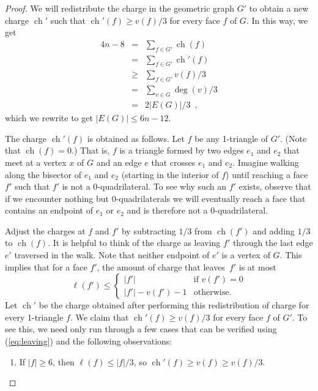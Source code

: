 \documentclass{patmorin}
\DeclareMathOperator{\ch}{ch}
\newcommand{\eqlabel}[1]{\label{eq:#1}}
\newcommand{\eqref}[1]{(\ref{eq:#1})}
\begin{document}
\begin{proof}
We will redistribute the charge in the geometric graph $G'$ to obtain a new charge $\ch'$
such that $\ch'(f) \ge v(f)/3$ for every face $f$ of $G$.  In this way, we
get
\begin{eqnarray*}
4n-8    & =  &  \sum_{f\in G'} \ch(f)\\
        & =  &  \sum_{f\in G'} \ch'(f)\\
        & \ge & \sum_{f\in G'} v(f)/3\\
        & = &   \sum_{v\in G} \deg(v)/3\\
        & = & 2|E(G)|/3 \enspace ,
\end{eqnarray*}
which we rewrite to get $|E(G)| \le 6n-12$.

The charge $\ch'(f)$ is obtained as follows.  Let $f$ be any 1-triangle of
$G'$.  (Note that $\ch(f) = 0$.)   That is, $f$ is a triangle formed by two
edges $e_1$ and $e_2$ that meet at a vertex $x$ of $G$ and an edge $e$ that
crosses $e_1$ and $e_2$.
Imagine walking along the bisector of $e_1$ and $e_2$ (starting in the
interior of $f$) until reaching a face $f'$ such that $f'$ is not a
0-quadrilateral.  To see why such an $f'$ exists, observe that if we
encounter nothing but 0-quadrilaterals we will eventually reach a face that
contains an endpoint of $e_1$ or $e_2$ and is therefore not a
0-quadrilateral.

Adjust the charges at $f$ and $f'$ by subtracting $1/3$ from $\ch(f')$ and
adding $1/3$ to $\ch(f)$.  It is helpful to think of the charge as leaving
$f'$ through the last edge $e'$ traversed in the walk.  Note that neither
endpoint of $e'$ is a vertex of $G$.  This implies that for a face $f'$,
the amount of charge that leaves~$f'$ is at most
\begin{equation}
   \ell(f') \le \left\{
            \begin{array}{ll}
              |f'|         & \mbox{if $v(f')=0$} \\
              |f'| - v(f') - 1 & \mbox{otherwise.}
            \end{array}
          \right.
  \eqlabel{leaving}
\end{equation}
Let $\ch'$ be the charge obtained after performing this redistribution of
charge for every 1-triangle $f$.  We claim that $\ch'(f) \ge v(f)/3$ for every face $f$ of $G'$.  To
see this, we need only run through a few cases that can be verified using
\eqref{leaving} and the following observations:

\begin{enumerate}
\item If $|f|\ge 6$, then $\ell(f) \le |f|/3$, so $\ch'(f) \ge v(f) \ge v(f)/3$.


\end{enumerate}
\end{proof}
\end{document}

